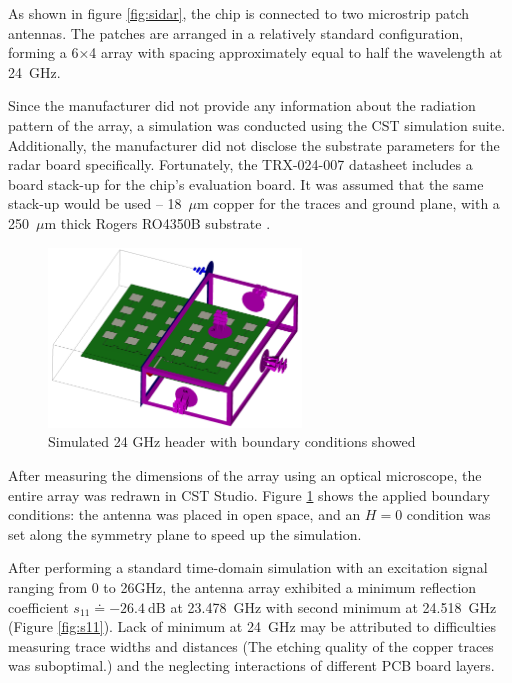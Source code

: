 As shown in figure \ref{fig:sidar}, the chip is connected to two microstrip patch antennas.
The patches are arranged in a relatively standard configuration, forming a 6×4 array with spacing approximately equal to half the wavelength at 24~GHz.

Since the manufacturer did not provide any information about the radiation pattern of the array, a simulation was conducted using the CST simulation suite.
Additionally, the manufacturer did not disclose the substrate parameters for the radar board specifically.
Fortunately, the TRX-024-007 datasheet includes a board stack-up for the chip's evaluation board.
It was assumed that the same stack-up would be used -- 18~$\mu$m copper for the traces and ground plane, with a 250~$\mu$m thick Rogers RO4350B substrate \cite{sidarTRX24}.

\begin{figure}[ht!]
  \centering
  \includegraphics[width=0.6\textwidth]{../img/boundaries.png}
  \caption[Simulated 24 GHz header with boundary conditions showed]{Simulated 24 GHz header with boundary conditions showed}
  \label{fig:boundaries}
\end{figure}

After measuring the dimensions of the array using an optical microscope, the entire array was redrawn in CST Studio.
Figure \ref{fig:boundaries} shows the applied boundary conditions: the antenna was placed in open space, and an $H=0$ condition was set along the symmetry plane to speed up the simulation.

After performing a standard time-domain simulation with an excitation signal ranging from 0 to 26GHz, the antenna array exhibited a minimum reflection coefficient $s_{11} \doteq -26.4 \mathrm{~dB}$ at 23.478~GHz with second minimum at 24.518~GHz (Figure \ref{fig:s11}).
Lack of minimum at 24~GHz may be attributed to difficulties measuring trace widths and distances (The etching quality of the copper traces was suboptimal.) and the neglecting interactions of different PCB board layers.

